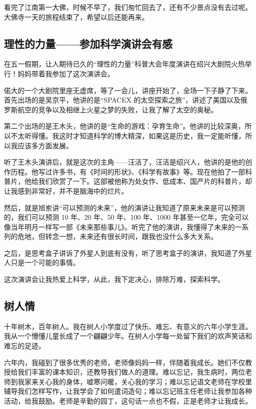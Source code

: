 \documentclass[UTF8,a4paper,titlepage,twoside,10.5pt]{article}
\begin{document}
看完了江南第一大佛，时候不早了，我们匆忙回去了，还有不少景点没有去过呢。大佛寺一天的旅程结束了，希望以后还能再来。

\subsection{理性的力量——参加科学演讲会有感}
\label{sec:org8702b90}

在五一假期，让人期待已久的“理性的力量”科普大会年度演讲在绍兴大剧院火热举行！妈妈带着我参加了这次演讲会。

偌大的一个大剧院里座无虚席，等了一会儿，讲座开始了，全场一下子静了下来。首先出场的是吴京平，他讲的是“SPACEX 的太空探索之旅”，讲述了美国以及俄罗斯航空的竞争以及相继上火星之梦的失败，让我了解了太空的奥秘。

第二个出场的是王木头，他讲的是“生命的游戏：孕育生命”。他讲的比较深奥，所以不太听得懂。我这时才知道科学的博大精深，如果这是历史，我一定能听懂，所以我应该多方面发展。

听了王木头演讲后，就是这次的主角——汪洁了，汪洁是绍兴人，他讲的是他的创作历程。他写过许多书，有《时间的形状》、《科学有故事》等。现在他拍了一部科普片，他给我们欣赏了一下。这部被他称为处女作、低成本、国产片的科普片，却让我感到非常好，并不是脑海中的烂片。

然后，就是旭岽讲“可以预测的未来”，他的演讲让我知道了原来未来是可以预测的，我们可以预测 10 年、20 年、50 年、100 年、1000 年甚至一亿年，完全可以像当年明月一样写一部《未来那些事儿》。听完了他的演讲，我懂得了未来的一系列的危地，但转念一想，未来还有很长时间，跟我也没什么多大关系。

之后，是思考盒子讲诉了外星人到底有没有，听了思考盒子的演讲，我知道了外星人只是一个可能的事情。

这次演讲会让我热爱上科学，从此，我下定决心，排除万难，探索科学。

\subsection{树人情}
\label{sec:orge72b8b8}

十年树木，百年树人。我在树人小学度过了快乐、难忘、有意义的六年小学生涯。我从一个懵懂儿童长成了一个翩翩少年。在树人小学每一处留下我们的欢声笑话和难忘的足迹。

六年内，我碰到了很多优秀的老师，老师像妈妈一样，伴随着我成长。她们不仅教授给我们丰富的课本知识，还教导我们做人的道理。难以忘记，我生病时，两位老师到我家来关心我的身体，嘘寒问暖，关心我的学习；难以忘记语文老师在学校里辅导我们怎样写作，让我学会了如何遣词造句；难以忘记班主任老师让我参加各种活动，给我鼓励。老师是辛勤的园丁，这句话一点也不假，正是老师才让我成长。
\end{document}

